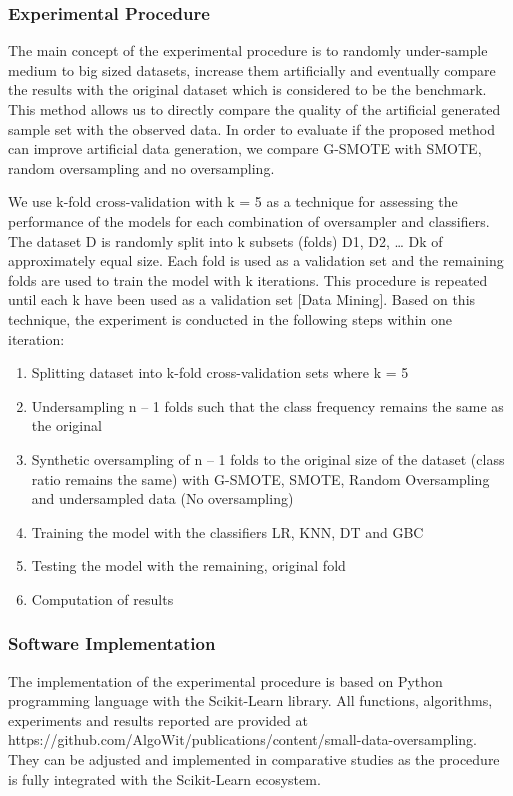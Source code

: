 \documentclass[parskip=full]{scrartcl}
\begin{document}
\subsubsection{Experimental Procedure}

The main concept of the experimental procedure is to randomly under-sample medium to big sized datasets, increase them artificially and eventually compare the results with the original dataset which is considered to be the benchmark. This method allows us to directly compare the quality of the artificial generated sample set with the observed data. In order to evaluate if the proposed method can improve artificial data generation, we compare G-SMOTE with SMOTE, random oversampling and no oversampling. 

We use k-fold cross-validation with k = 5 as a technique for assessing the performance of the models for each combination of oversampler and classifiers. The dataset D is randomly split into k subsets (folds) D1, D2, … Dk of approximately equal size. Each fold is used as a validation set and the remaining folds are used to train the model with k iterations. This procedure is repeated until each k have been used as a validation set [Data Mining]. Based on this technique, the experiment is conducted in the following steps within one iteration:

\begin{enumerate}
	\item 
	Splitting dataset into k-fold cross-validation sets where k = 5
	\item 
	Undersampling n – 1 folds such that the class frequency remains the same as the original
	\item 
	Synthetic oversampling of n – 1 folds to the original size of the dataset (class ratio remains the same) with G-SMOTE, SMOTE, Random Oversampling and undersampled data (No oversampling)
	\item 
	Training the model with the classifiers LR, KNN, DT and GBC
	\item 
	Testing the model with the remaining, original fold
	\item 
	Computation of results
\end{enumerate}	

\subsubsection{Software Implementation}

The implementation of the experimental procedure is based on Python programming language with the Scikit-Learn \cite{PedregosaF.VaroquauxG.GramfortA.MichelV.ThirionB.GriselO.BlondelM.Prette.2011} library. All functions, algorithms, experiments and results reported are provided at https://github.com/AlgoWit/publications/content/small-data-oversampling. They can be adjusted and implemented in comparative studies as the procedure is fully integrated with the Scikit-Learn ecosystem.    
\end{document}
